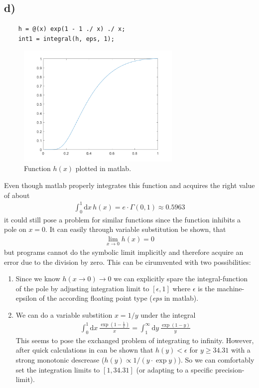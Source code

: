 \documentclass[12pt,a4paper]{article}
\begin{document}
	\subsection*{d)}
		\begin{lstlisting}
	h = @(x) exp(1 - 1 ./ x) ./ x;
	int1 = integral(h, eps, 1);
		\end{lstlisting}
		\begin{figure}[H]
			\centering
			\includegraphics[width=0.7\textwidth]{A1/A1_d.png}
			\caption[]{Function \(h(x)\) plotted in matlab.}
		\end{figure}
		Even though matlab properly integrates this function and acquires
		the right value of about
		\begin{align}
			\int_0^1\text{d}x\,h(x)=e\cdot\Gamma\left(0,1\right)\approx 0.5963
		\end{align}
		it could still pose a problem for similar functions since the function
		inhibits a pole on \(x=0\). It can easily through variable substitution be shown,
		that
		\begin{align}
			\lim_{x\rightarrow 0}h(x)=0
		\end{align}
		but programs cannot do the symbolic limit implicitly and therefore acquire an error
		due to the division by zero. This can be cirumvented with two possibilities:
		\begin{enumerate}
			\item Since we know \(h(x\rightarrow0)\rightarrow0\) we can explicitly spare the
			integral-function of the pole by adjusting integration limit to \(\left[\epsilon,1\right]\)
			where \(\epsilon\) is the machine-epsilon of the according floating point type (\textit{eps} in matlab).
			\item We can do a variable substition \(x=1/y\) under the integral
			\begin{align}
				\int_0^1\text{d}x\,\frac{\exp\left(1-\frac{1}{x}\right)}{x}=\int_1^\infty\text{d}y\,\frac{\exp\left(1-y\right)}{y}
			\end{align}
			This seems to pose the exchanged problem of integrating to infinity. However, after quick
			calculations in can be shown that \(h(y)<\epsilon\) for \(y\geq 34.31\) with a
			strong monotonic descrease (\(h(y)\propto1/\left(y\cdot\exp y\right)\)). So we can comfortably
			set the integration limits to \([1,34.31]\) (or adapting to a specific precision-limit).
		\end{enumerate}
		\newpage
\end{document}
